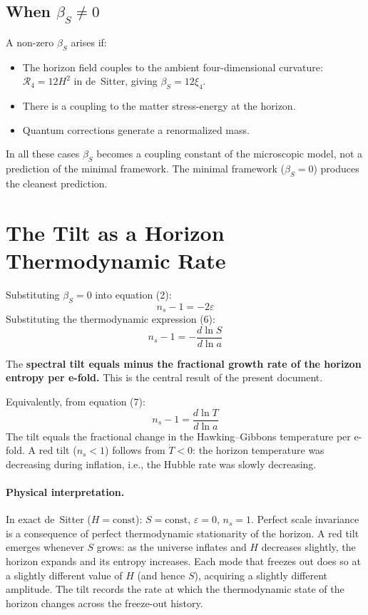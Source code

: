 \documentclass[12pt,a4paper]{article}
\begin{document}
\subsection{When $\beta_S \neq 0$}

A non-zero $\beta_S$ arises if:
\begin{itemize}
  \item The horizon field couples to the ambient four-dimensional curvature: $\mathcal{R}_4 = 12H^2$ in de~Sitter, giving $\beta_S = 12\xi_4$.
  \item There is a coupling to the matter stress-energy at the horizon.
  \item Quantum corrections generate a renormalized mass.
\end{itemize}
In all these cases $\beta_S$ becomes a coupling constant of the microscopic model, not a prediction of the minimal framework. The minimal framework ($\beta_S = 0$) produces the cleanest prediction.

\section{The Tilt as a Horizon Thermodynamic Rate}

Substituting $\beta_S = 0$ into equation (2):
\begin{equation}
n_s - 1 = -2\varepsilon \tag{12}
\end{equation}
Substituting the thermodynamic expression (6):
\begin{equation}
\boxed{n_s - 1 = -\frac{d\ln S}{d\ln a}} \tag{13}
\end{equation}

The \textbf{spectral tilt equals minus the fractional growth rate of the horizon entropy per e-fold.} This is the central result of the present document.

Equivalently, from equation (7):
\begin{equation}
n_s - 1 = \frac{d\ln T}{d\ln a} \tag{14}
\end{equation}
The tilt equals the fractional change in the Hawking--Gibbons temperature per e-fold. A red tilt ($n_s < 1$) follows from $\dot{T} < 0$: the horizon temperature was decreasing during inflation, i.e., the Hubble rate was slowly decreasing.

\paragraph{Physical interpretation.}
In exact de~Sitter ($H = \text{const}$): $S = \text{const}$, $\varepsilon = 0$, $n_s = 1$. Perfect scale invariance is a consequence of perfect thermodynamic stationarity of the horizon. A red tilt emerges whenever $S$ grows: as the universe inflates and $H$ decreases slightly, the horizon expands and its entropy increases. Each mode that freezes out does so at a slightly different value of $H$ (and hence $S$), acquiring a slightly different amplitude. The tilt records the rate at which the thermodynamic state of the horizon changes across the freeze-out history.
\end{document}
